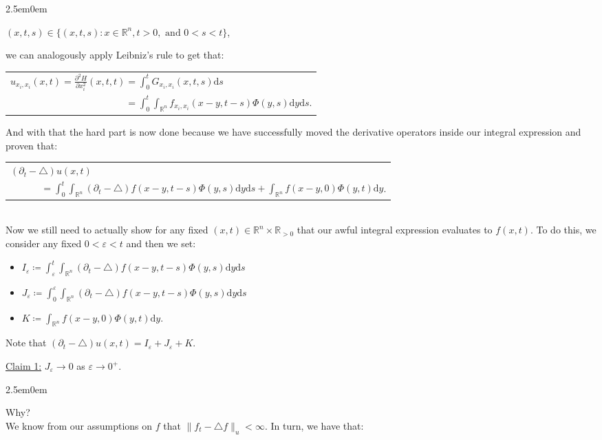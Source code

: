 \documentclass{book}
\newcommand{\exPPP}{%
   \color{VioletRed}%
   \fontsize{12}{14}\selectfont%
}
\newenvironment{myIndent}{%
   \begin{adjustwidth}{2.5em}{0em}%
}{%
   \end{adjustwidth}%
}
\newcommand{\df}{\mathrm{d}}
\newcommand{\mySepThree}[1][.]{%
   {\noindent\color{#1}{\rule{6in}{0.25mm}}}\\%
}
\newcommand{\retTwo}{\hfill\bigbreak}
\begin{document}
\begin{myIndent}
	{\centering$(x, t, s) \in \{(x, t, s) : x \in \mathbb{R}^n, t > 0, \text{ and } 0 < s < t\}$,\\ [4pt]\par}

	we can analogously apply Leibniz's rule to get that:
	
	{\centering\begin{tabular}{l}
	$u_{x_i, x_i}(x, t) = \frac{\partial^2 H}{\partial x_i^2}(x, t, t) = \int_{0}^t G_{x_i, x_i}(x, t, s)\df s$\\ [4pt]
	$\phantom{u_{x_i, x_i}(x, t) = \frac{\partial^2 H}{\partial x_i^2}(x, t, t)} = \int_0^t \int_{\mathbb{R}^n} f_{x_i, x_i}(x - y, t- s)\Phi(y, s)\df y \df s$.
	\end{tabular}\retTwo\par}

	And with that the hard part is now done because we have successfully moved the derivative operators inside our integral expression and proven that:

	{\centering\begin{tabular}{l}
		$(\partial_t - \triangle)u(x, t)$\\ [2pt]
		$\phantom{aaaaaa} = \int_0^t \int_{\mathbb{R}^n}(\partial_t - \triangle)f(x - y, t - s)\Phi(y, s)\df y \df s + \int_{\mathbb{R}^n}f(x - y, 0)\Phi(y, t)\df y$.
	\end{tabular} \retTwo\par}

	\mySepThree 

	Now we still need to actually show for any fixed $(x, t) \in \mathbb{R}^n \times \mathbb{R}_{>0}$ that our awful integral expression evaluates to $f(x, t)$. To do this, we consider any fixed $0 < \varepsilon < t$ and then we set:
	\begin{itemize}
		\item $I_\varepsilon \coloneqq \int_\varepsilon^t \int_{\mathbb{R}^n}(\partial_t - \triangle)f(x - y, t - s)\Phi(y, s)\df y \df s$
		\item $J_\varepsilon \coloneqq \int_0^\varepsilon \int_{\mathbb{R}^n}(\partial_t - \triangle)f(x - y, t - s)\Phi(y, s)\df y \df s$
		\item $K \coloneqq \int_{\mathbb{R}^n}f(x - y, 0)\Phi(y, t)\df y$.\retTwo
	\end{itemize}

	Note that $(\partial_t - \triangle)u(x, t) = I_\varepsilon + J_\varepsilon + K$.\retTwo

	\ul{Claim 1:} $J_\varepsilon \to 0$ as $\varepsilon \to 0^+$.
	\begin{myIndent}\exPPP
		Why?\\
		We know from our assumptions on $f$ that $\|f_t - \triangle f\|_u < \infty$. In turn, we have that:
		

\end{myIndent}
\end{myIndent}
\end{document}
